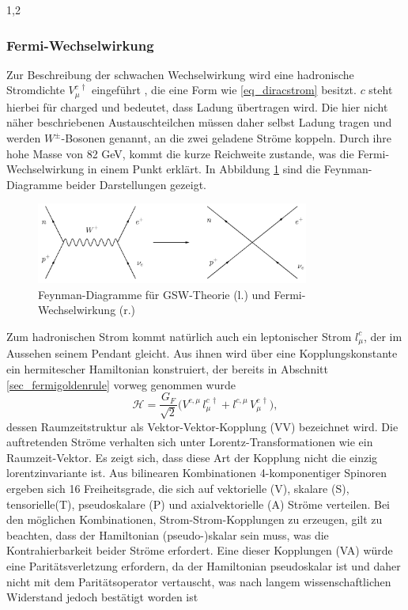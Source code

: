 \documentclass[11pt,a4paper,twoside]{report}
\begin{document}
\begin{spacing}{1,2}
\subsubsection{Fermi-Wechselwirkung}
\label{sec_fermiWW}
Zur Beschreibung der schwachen Wechselwirkung wird eine hadronische Stromdichte $V_\mu^{c\,\dagger}$ eingeführt \cite{Klapdor}, die eine Form wie 
\eqref{eq_diracstrom} besitzt. 
$c$ steht hierbei für charged und bedeutet, dass Ladung
übertragen wird. Die hier nicht näher beschriebenen Austauschteilchen müssen daher selbst Ladung tragen und werden $W^\pm$-Bosonen genannt, an die zwei 
geladene Ströme koppeln. Durch ihre hohe Masse von 82 GeV, kommt die kurze Reichweite zustande, was die Fermi-Wechselwirkung in einem Punkt erklärt. In
Abbildung \ref{pic_4fermi} sind die Feynman-Diagramme beider Darstellungen gezeigt.
\begin{figure}[H]
\includegraphics[width=0.8\textwidth]{Abbildungen/4fermi.jpg}
\caption{Feynman-Diagramme für GSW-Theorie (l.) und Fermi-Wechselwirkung (r.)}
\label{pic_4fermi}
\end{figure}
Zum hadronischen Strom kommt natürlich auch ein leptonischer Strom $l_\mu^c$, der im Aussehen seinem Pendant gleicht. Aus ihnen wird über eine Kopplungskonstante
ein hermitescher Hamiltonian konstruiert, der bereits in Abschnitt \ref{sec_fermigoldenrule} vorweg genommen wurde
\begin{equation}
 \mathcal{H} = \frac{G_F}{\sqrt{2}}\big(V^{c,\mu}\,l_\mu^{c\,\dagger} + l^{c,\mu}\,V_\mu^{c\,\dagger}\big),
\end{equation}
dessen Raumzeitstruktur als Vektor-Vektor-Kopplung (VV) bezeichnet wird. Die auftretenden Ströme verhalten sich unter Lorentz-Transformationen wie ein Raumzeit-Vektor.
Es zeigt sich, dass diese Art der Kopplung nicht die einzig lorentzinvariante ist. Aus bilinearen Kombinationen 4-komponentiger Spinoren ergeben sich 16 Freiheitsgrade,
die sich auf vektorielle (V), skalare (S), tensorielle(T), pseudoskalare (P) und axialvektorielle (A) Ströme verteilen. Bei den möglichen Kombinationen, Strom-Strom-Kopplungen zu erzeugen, gilt zu beachten, dass
der Hamiltonian (pseudo-)skalar sein muss, was die Kontrahierbarkeit beider Ströme erfordert. Eine dieser Kopplungen (VA) würde eine Paritätsverletzung erfordern,
da der Hamiltonian pseudoskalar ist und daher nicht mit dem Paritätsoperator vertauscht, was nach langem wissenschaftlichen Widerstand jedoch bestätigt worden
ist


\end{spacing}
\end{document}
